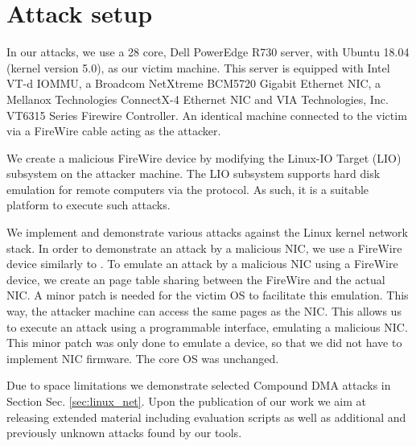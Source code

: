 \section{Attack setup}
In our attacks, we use a 28 core, Dell PowerEdge R730 server, with Ubuntu 18.04 (kernel version 5.0), as our victim machine. This server is equipped with Intel VT-d IOMMU, a Broadcom NetXtreme BCM5720 Gigabit Ethernet NIC, a Mellanox Technologies ConnectX-4 Ethernet NIC and VIA Technologies, Inc. VT6315 Series Firewire Controller. An identical machine connected to the victim via a FireWire cable acting as the attacker. 

We create a malicious FireWire device by modifying the Linux-IO Target (LIO) subsystem on the attacker machine. The LIO subsystem supports hard disk emulation for remote computers via the \spb{} protocol. As such, it is a suitable platform to execute such attacks. 

We implement and demonstrate various attacks against the Linux kernel network stack. In order to demonstrate an attack by a malicious NIC, we use a FireWire device similarly to \cite{SLND10}. To emulate an attack by a malicious NIC using a FireWire device, we create an \iova{} page table sharing between the FireWire and the actual NIC. A minor patch is needed for the victim OS to facilitate this emulation. This way, the attacker machine can access the same pages as the NIC. This allows us to execute an attack using a programmable interface, emulating a malicious NIC. This minor patch was only done to emulate a device, so that we did not have to implement NIC firmware. The core OS was unchanged.

Due to space limitations we demonstrate selected Compound DMA attacks in Section Sec. \ref{sec:linux_net}. Upon the publication of our work we aim at releasing extended material including evaluation scripts as well as additional \compound and previously unknown \simple attacks found by our tools.